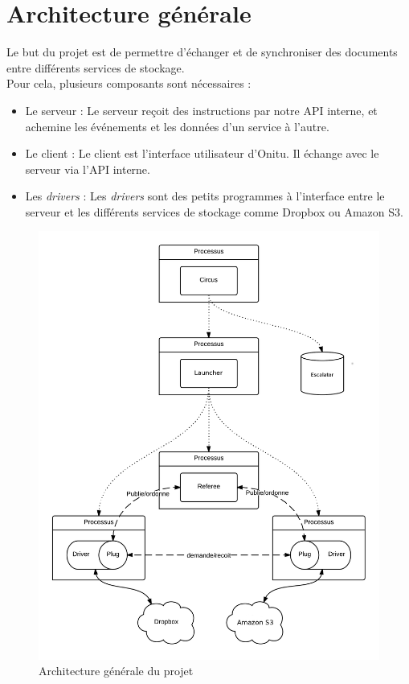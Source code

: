 \section{Architecture générale}
Le but du projet est de permettre d'échanger et de synchroniser des documents entre différents services de stockage.\\

Pour cela, plusieurs composants sont nécessaires :
\begin{itemize}
\renewcommand{\labelitemi}{$\bullet$}
   \item Le serveur : Le serveur reçoit des instructions par notre API interne, et achemine les événements et les données d'un service à l'autre.
   \item Le client : Le client est l'interface utilisateur d'Onitu. Il échange avec le serveur via l'API interne.
   \item Les \textit{drivers} : Les \textit{drivers} sont des petits programmes à l'interface entre le serveur et les différents services de stockage comme Dropbox ou Amazon S3.
\end{itemize}

\begin{figure}
    \center
    \includegraphics[scale=0.25]{architecture.png}
    \caption{Architecture générale du projet}
\end{figure}

